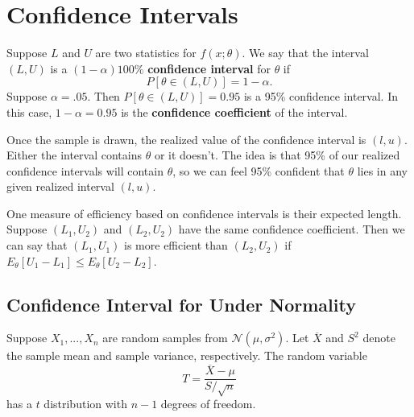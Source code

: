 \documentclass[12pt]{article}
\newcommand{\normal}[2]{\mathcal{N} \left({#1}, {#2} \right)}
\theoremstyle{definition}
\begin{document}
\section{Confidence Intervals}

Suppose $L$ and $U$ are two statistics for $f(x;\theta)$. We say that the interval $(L,U)$ is a $(1 - \alpha)100\%$ \textbf{confidence interval} for $\theta$ if
	\[ P[\theta \in (L,U)] = 1 - \alpha.\]
Suppose $\alpha = .05$. Then $P[ \theta \in (L,U)]=0.95$ is a 95\% confidence interval. In this case, $1 - \alpha = 0.95$ is the \textbf{confidence coefficient} of the interval. 

Once the sample is drawn, the realized value of the confidence interval is $(l,u)$. Either the interval contains $\theta$ or it doesn't. The idea is that 95\% of our realized confidence intervals will contain $\theta$, so we can feel 95\% confident that $\theta$ lies in any given realized interval $(l,u)$.

One measure of efficiency based on confidence intervals is their expected length. Suppose $(L_1, U_2)$ and $(L_2, U_2)$ have the same confidence coefficient. Then we can say that $(L_1, U_1)$ is more efficient than $(L_2, U_2)$ if $E_{\theta}[U_1 - L_1] \leq E_{\theta}[U_2-
 L_2]$. 
 
 
 
\subsection{Confidence Interval for \bm{$\mu$} Under Normality}


Suppose $X_1, ..., X_n$ are random samples from $\normal{\mu}{\sigma^2}$. Let $\overline{X}$ and $S^2$  denote the sample mean and sample variance, respectively. The random variable
	\[T = \frac{\overline{X} - \mu}{S / \sqrt{n}}	\]
has a $t$ distribution with $n-1$ degrees of freedom. 
\end{document}
